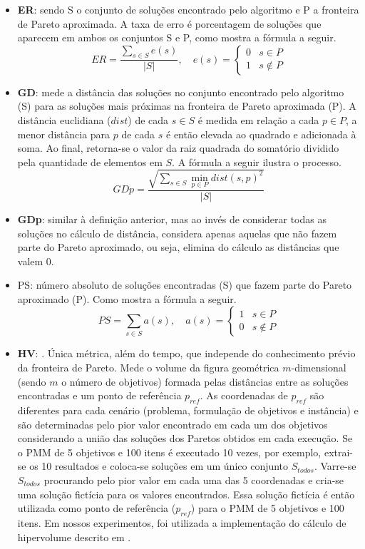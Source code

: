 \begin{itemize}
	\item \textbf{\ac{ER}}: sendo S o conjunto de soluções encontrado pelo algoritmo e P a fronteira de Pareto aproximada. A taxa de erro é porcentagem de soluções que aparecem em ambos os conjuntos S e P, como mostra a fórmula a seguir.
	\[
		ER = \frac{\sum\limits_{s \in S} e(s)}{|S|}, \quad
		e(s) = 
		\begin{cases} 
			0 & s \in P \\
			1 & s \notin P
		\end{cases}
	\]
	\item \textbf{\ac{GD}}: mede a distância das soluções no conjunto encontrado pelo algoritmo (S) para as soluções mais próximas na fronteira de Pareto aproximada (P). A distância euclidiana ($dist$) de cada $s \in S$ é medida em relação a cada $p \in P$, a menor distância para $p$ de cada $s$ é então elevada ao quadrado e adicionada à soma. Ao final, retorna-se o valor da raiz quadrada do somatório dividido pela quantidade de elementos em $S$. A fórmula a seguir ilustra o processo.
	\[GDp = \frac{\sqrt{\sum\limits_{s \in S} \min\limits_{p \in P} dist(s, p)^2}}{|S|}\]
	\item \textbf{\ac{GDp}}: similar à definição anterior, mas ao invés de considerar todas as soluções no cálculo de distância, considera apenas aquelas que não fazem parte do Pareto aproximado, ou seja, elimina do cálculo as distâncias que valem 0.
	\item \ac{PS}: número absoluto de soluções encontradas (S) que fazem parte do Pareto aproximado (P). Como mostra a fórmula a seguir.
	\[
		PS = \sum\limits_{s \in S} a(s), \quad
		a(s) = 
		\begin{cases} 
			1 & s \in P \\
			0 & s \notin P
		\end{cases}
	\]
	\item \textbf{\ac{HV}}: \cite{Bradstreet2012}. Única métrica, além do tempo, que independe do conhecimento prévio da fronteira de Pareto. Mede o volume da figura geométrica $m$-dimensional (sendo $m$ o número de objetivos) formada pelas distâncias entre as soluções encontradas e um ponto de referência $p_{ref}$. As coordenadas de $p_{ref}$ são diferentes para cada cenário (problema, formulação de objetivos e instância) e são determinadas pelo pior valor encontrado em cada um dos objetivos considerando a união das soluções dos Paretos obtidos em cada execução. Se o PMM de 5 objetivos e 100 itens é executado 10 vezes, por exemplo, extrai-se os 10 resultados e coloca-se soluções em um único conjunto $S_{todos}$. Varre-se $S_{todos}$ procurando pelo pior valor em cada uma das 5 coordenadas e cria-se uma solução fictícia para os valores encontrados. Essa solução fictícia é então utilizada como ponto de referência ($p_{ref}$) para o PMM de 5 objetivos e 100 itens. Em nossos experimentos, foi utilizada a implementação do cálculo de hipervolume descrito em \cite{Bradstreet2012}.

\end{itemize}
